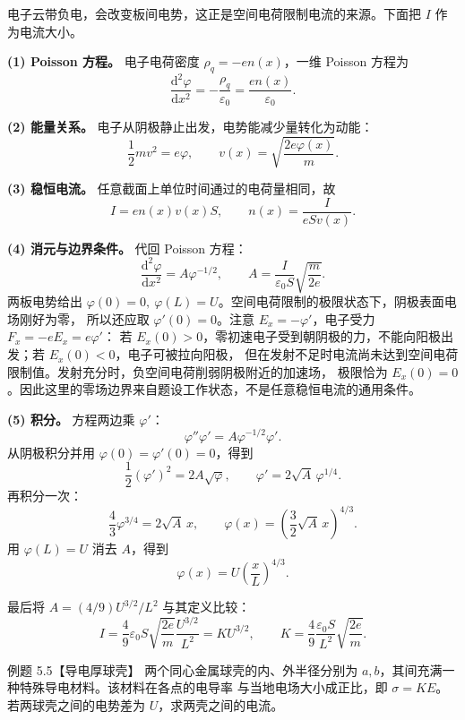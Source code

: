 \begin{xesolution}
电子云带负电，会改变板间电势，这正是空间电荷限制电流的来源。下面把 $I$ 作为电流大小。

\textbf{(1) Poisson 方程。} 电子电荷密度 $\rho_q=-en(x)$，一维 Poisson 方程为
\[
  \frac{\mathrm d^2\varphi}{\mathrm dx^2}
  =-\frac{\rho_q}{\varepsilon_0}=\frac{en(x)}{\varepsilon_0}.
\]

\textbf{(2) 能量关系。} 电子从阴极静止出发，电势能减少量转化为动能：
\[
  \frac12mv^2=e\varphi,
  \qquad v(x)=\sqrt{\frac{2e\varphi(x)}m}.
\]

\textbf{(3) 稳恒电流。} 任意截面上单位时间通过的电荷量相同，故
\[
  I=en(x)v(x)S,
  \qquad n(x)=\frac{I}{eSv(x)}.
\]

\textbf{(4) 消元与边界条件。} 代回 Poisson 方程：
\[
  \frac{\mathrm d^2\varphi}{\mathrm dx^2}
  =A\varphi^{-1/2},
  \qquad
  A=\frac{I}{\varepsilon_0S}\sqrt{\frac m{2e}}.
\]
两板电势给出 $\varphi(0)=0,\ \varphi(L)=U$。空间电荷限制的极限状态下，阴极表面电场刚好为零，
所以还应取 $\varphi'(0)=0$。注意 $E_x=-\varphi'$，电子受力 $F_x=-eE_x=e\varphi'$：
若 $E_x(0)>0$，零初速电子受到朝阴极的力，不能向阳极出发；若 $E_x(0)<0$，电子可被拉向阳极，
但在发射不足时电流尚未达到空间电荷限制值。发射充分时，负空间电荷削弱阴极附近的加速场，
极限恰为 $E_x(0)=0$。因此这里的零场边界来自题设工作状态，不是任意稳恒电流的通用条件。

\textbf{(5) 积分。} 方程两边乘 $\varphi'$：
\[
  \varphi''\varphi'=A\varphi^{-1/2}\varphi'.
\]
从阴极积分并用 $\varphi(0)=\varphi'(0)=0$，得到
\[
  \frac12(\varphi')^2=2A\sqrt\varphi,
  \qquad \varphi'=2\sqrt A\,\varphi^{1/4}.
\]
再积分一次：
\[
  \frac43\varphi^{3/4}=2\sqrt A\,x,
  \qquad
  \varphi(x)=\left(\frac32\sqrt A\,x\right)^{4/3}.
\]
用 $\varphi(L)=U$ 消去 $A$，得到
\[
  \boxed{\varphi(x)=U\left(\frac xL\right)^{4/3}}.
\]

\childLangmuirFigure
{}

最后将 $A=(4/9)U^{3/2}/L^2$ 与其定义比较：
\[
  \boxed{I=\frac49\varepsilon_0S\sqrt{\frac{2e}{m}}
  \frac{U^{3/2}}{L^2}=KU^{3/2}},
  \qquad
  \boxed{K=\frac49\frac{\varepsilon_0S}{L^2}\sqrt{\frac{2e}{m}}}.
\]
\end{xesolution}

\begin{origexamplebox}{例题 5.5【导电厚球壳】}
两个同心金属球壳的内、外半径分别为 $a,b$，其间充满一种特殊导电材料。该材料在各点的电导率
与当地电场大小成正比，即 $\sigma=KE$。若两球壳之间的电势差为 $U$，求两壳之间的电流。
\emConductingShellQuestion
{}\label{fig:em-source-thirty-sixth-section-5}
\end{origexamplebox}

